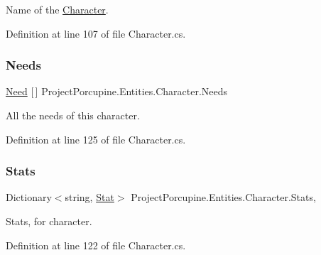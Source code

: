 Name of the \hyperlink{class_project_porcupine_1_1_entities_1_1_character}{Character}. 



Definition at line 107 of file Character.\+cs.

\mbox{\label{class_project_porcupine_1_1_entities_1_1_character_ac92263a27f7fd4001b18d0b01b24ab2f}} 
\subsubsection{\texorpdfstring{Needs}{Needs}}
{\footnotesize\ttfamily \hyperlink{class_project_porcupine_1_1_entities_1_1_need}{Need} \mbox{[}$\,$\mbox{]} Project\+Porcupine.\+Entities.\+Character.\+Needs\hspace{0.3cm}{\ttfamily [get]}}



All the needs of this character. 



Definition at line 125 of file Character.\+cs.

\mbox{\label{class_project_porcupine_1_1_entities_1_1_character_a6c6632eda9fdf6d2739291d69faf73ec}} 
\subsubsection{\texorpdfstring{Stats}{Stats}}
{\footnotesize\ttfamily Dictionary$<$string, \hyperlink{class_project_porcupine_1_1_entities_1_1_stat}{Stat}$>$ Project\+Porcupine.\+Entities.\+Character.\+Stats\hspace{0.3cm}{\ttfamily [get]}, {}}



Stats, for character. 



Definition at line 122 of file Character.\+cs.

